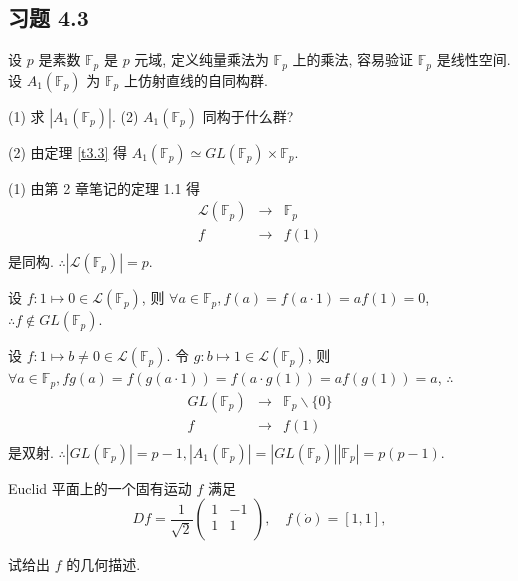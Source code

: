 \documentclass[color=black,device=normal,lang=cn,mode=geye]{elegantnote}
\begin{document}
\subsection{习题 4.3}
    
\begin{exercise}%
    设 $p$ 是素数 $\mathbb{F}_p$ 是 $p$ 元域, 定义纯量乘法为 $\mathbb{F}_p$ 上的乘法, 容易验证 $\mathbb{F}_p$ 是线性空间. 设 $A_1(\mathbb{F}_p)$ 为 $\mathbb{F}_p$ 上仿射直线的自同构群.

    (1) 求 $|A_1(\mathbb{F}_p)|$. (2) $A_1(\mathbb{F}_p)$ 同构于什么群?
\end{exercise}
\begin{solution}
    (2) 由定理 \ref{t3.3} 得 $A_1(\mathbb{F}_p)\simeq GL (\mathbb{F}_p)\times\mathbb{F}_p$.

    (1) 由第 2 章笔记的定理 1.1 得
    \[\begin{array}{rcl}
        \mathcal{L}(\mathbb{F}_p) & \to & \mathbb{F}_p \\
        f & \to & f(1) \\
    \end{array}\]
    是同构. $\therefore|\mathcal{L}(\mathbb{F}_p)|=p$.

    设 $f:1\mapsto0\in\mathcal{L}(\mathbb{F}_p)$, 则 $\forall a\in\mathbb{F}_p,f(a)=f(a\cdot 1)=af(1)=0$, $\therefore f\notin GL (\mathbb{F}_p)$.

    设 $f:1\mapsto b\neq0\in\mathcal{L}(\mathbb{F}_p)$. 令 $g:b\mapsto 1\in\mathcal{L}(\mathbb{F}_p)$, 则 $\forall a\in\mathbb{F}_p,fg(a)=f(g(a\cdot 1))=f(a\cdot g(1))=af(g(1))=a$, $\therefore$
    \[\begin{array}{rcl}
        GL (\mathbb{F}_p) & \to & \mathbb{F}_p\backslash\{0\} \\
        f & \to & f(1) \\
    \end{array}\]
    是双射. $\therefore| GL (\mathbb{F}_p)|=p-1,|A_1(\mathbb{F}_p)|=| GL (\mathbb{F}_p)||\mathbb{F}_p|=p(p-1)$.
\end{solution}
\begin{exercise}%
    Euclid 平面上的一个固有运动 $f$ 满足
    \[Df=\dfrac{1}{\sqrt{2}}\begin{pmatrix}
        1 & -1 \\
        1 & 1 \\
    \end{pmatrix},\quad f(\dot{o})=[1,1],\]

    试给出 $f$ 的几何描述.
\end{exercise}
\end{document}
